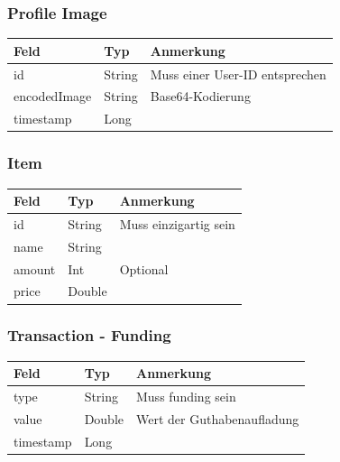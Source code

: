 \documentclass[a4paper, 11pt]{article}
\begin{document}
\subsubsection*{Profile Image}
\label{subsubsec:attachments:schemas:profileimage}
\begin{table}[H]
	\centering
	\begin{tabular}{@{}lll@{}}
		Feld         & Typ    & Anmerkung                      \\ \toprule
		id           & String & Muss einer User-ID entsprechen \\ \midrule
		encodedImage & String & Base64-Kodierung               \\ \midrule
		timestamp    & Long   &                                \\ \bottomrule
	\end{tabular}
	\label{tab:attachments:schemas:profileimage}
\end{table}

\subsubsection*{Item}
\label{subsubsec:attachments:schemas:item}
\begin{table}[H]
	\centering
	\begin{tabular}{@{}lll@{}}
		Feld   & Typ    & Anmerkung             \\ \toprule
		id     & String & Muss einzigartig sein \\ \midrule
		name   & String &                       \\ \midrule
		amount & Int    & Optional              \\ \midrule
		price  & Double &                       \\ \bottomrule
	\end{tabular}
	\label{tab:attachments:schemas:item}
\end{table}

\subsubsection*{Transaction - Funding}
\label{subsubsec:attachments:schemas:funding}
\begin{table}[H]
	\centering
	\begin{tabular}{@{}lll@{}}
		Feld      & Typ    & Anmerkung                      \\ \toprule
		type      & String & Muss \glqq funding\grqq{} sein \\ \midrule
		value     & Double & Wert der Guthabenaufladung     \\ \midrule
		timestamp & Long   &                                \\ \bottomrule
	\end{tabular}
	\label{tab:attachments:schemas:funding}
\end{table}
\end{document}
